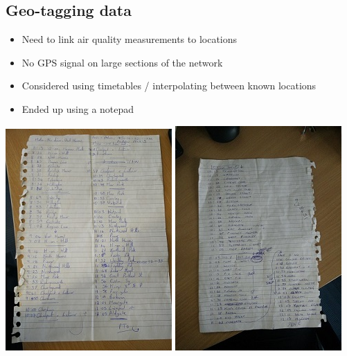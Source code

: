 \documentclass[]{article}
\providecommand{\tightlist}{%
  \setlength{\itemsep}{0pt}\setlength{\parskip}{0pt}}
\begin{document}
\hypertarget{geo-tagging-data}{%
\subsection{Geo-tagging data}\label{geo-tagging-data}}

\begin{itemize}
\tightlist
\item
  Need to link air quality measurements to locations
\item
  No GPS signal on large sections of the network
\item
  Considered using timetables / interpolating between known locations
\item
  Ended up using a notepad
\end{itemize}

\includegraphics{images/metropolitan_line_1.jpg}
\includegraphics{images/northern_line_2.jpg}
\end{document}
